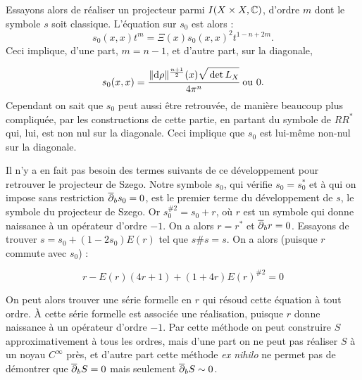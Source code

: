 Essayons alors de réaliser un projecteur parmi $I(X\times X,\mathbb{C})$, d'ordre $m$ dont le symbole $s$ soit classique. L'équation sur $s_0$ est alors :
\begin{equation*}
  s_0(x,x)t^m = \Xi(x)s_0(x,x)^2t^{1-n+2m}.
\end{equation*}
Ceci implique, d'une part, $m=n-1$, et d'autre part, sur la diagonale,

\begin{equation*}
  s_0(x,x) = \cfrac{\|\dd\rho\|^{\frac{n+1}{2}}(x)\sqrt{\vphantom{\hat{A}}\det L_X}}{4\pi^n} \text{ ou } 0.
\end{equation*}
Cependant on sait que $s_0$ peut aussi être retrouvée, de manière beaucoup plus compliquée, par les constructions de cette partie, en partant du symbole de $RR^*$ qui, lui, est non nul sur la diagonale. Ceci implique que $s_0$ est lui-même non-nul sur la diagonale.

Il n'y a en fait pas besoin des termes suivants de ce développement pour retrouver le projecteur de Szego. Notre symbole $s_0$, qui vérifie $s_0 = s_0^*$ et à qui on impose sans restriction $\overline{\partial}_b s_0=0$, est le premier terme du développement de $s$, le symbole du projecteur de Szego. Or $s_0^{\#2}=s_0+r$, où $r$ est un symbole qui donne naissance à un opérateur d'ordre $-1$. On a alors $r=r^*$ et $\overline{\partial}_b r=0$. Essayons de trouver $s=s_0+(1-2s_0)E(r)$ tel que $s\#s=s$. On a alors (puisque $r$ commute avec $s_0$) :

\begin{equation*}
  r-E(r)(4r+1)+(1 + 4r)E(r)^{\#2}= 0
\end{equation*}

On peut alors trouver une série formelle en $r$ qui résoud cette équation à tout ordre. À cette série formelle est associée une réalisation, puisque $r$ donne naissance à un opérateur d'ordre $-1$. Par cette méthode on peut construire $S$ approximativement à tous les ordres, mais d'une part on ne peut pas réaliser $S$ à un noyau $C^{\infty}$ près, et d'autre part cette méthode \emph{ex nihilo} ne permet pas de démontrer que $\overline{\partial}_b S=0$ mais seulement $\overline{\partial}_b S \sim 0$.
